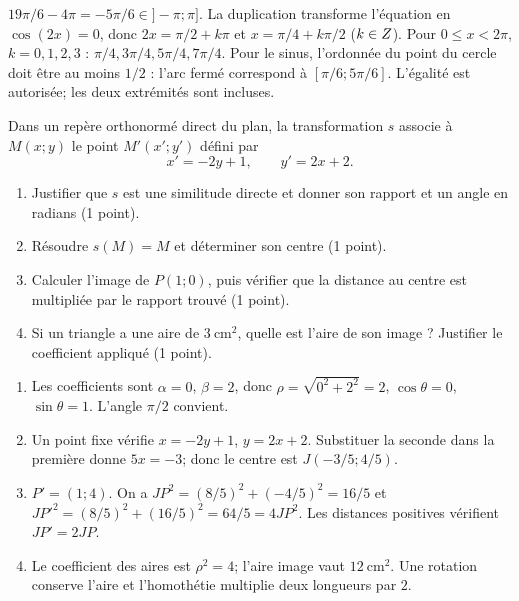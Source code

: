 \begin{corrige}\label{sol-t11s-ds3-e02}
$19\pi/6-4\pi=-5\pi/6\in]-\pi;\pi]$. La duplication transforme l’équation en $\cos(2x)=0$, donc $2x=\pi/2+k\pi$ et $x=\pi/4+k\pi/2$ ($k\in Z$). Pour $0\le x<2\pi$, $k=0,1,2,3$ : $\pi/4,3\pi/4,5\pi/4,7\pi/4$. Pour le sinus, l’ordonnée du point du cercle doit être au moins $1/2$ : l’arc fermé correspond à $[\pi/6;5\pi/6]$. L’égalité est autorisée; les deux extrémités sont incluses.
\end{corrige}
\label{t11s-ds3-e03}\par
Dans un repère orthonormé direct du plan, la transformation $s$ associe à $M(x;y)$ le point $M'(x';y')$ défini par
\[
x'=-2y+1,\qquad y'=2x+2.
\]
\begin{enumerate}
\item Justifier que $s$ est une similitude directe et donner son rapport et un angle en radians (1 point).
\item Résoudre $s(M)=M$ et déterminer son centre (1 point).
\item Calculer l’image de $P(1;0)$, puis vérifier que la distance au centre est multipliée par le rapport trouvé (1 point).
\item Si un triangle a une aire de $3\ \mathrm{cm}^2$, quelle est l’aire de son image ? Justifier le coefficient appliqué (1 point).
\end{enumerate}
\begin{corrige}\label{sol-t11s-ds3-e03}
\begin{enumerate}
\item Les coefficients sont $\alpha=0$, $\beta=2$, donc $\rho=\sqrt{0^2+2^2}=2$, $\cos\theta=0$, $\sin\theta=1$. L’angle $\pi/2$ convient.
\item Un point fixe vérifie $x=-2y+1$, $y=2x+2$. Substituer la seconde dans la première donne $5x=-3$; donc le centre est $J(-3/5;4/5)$.
\item $P'=(1;4)$. On a $JP^2=(8/5)^2+(-4/5)^2=16/5$ et $JP'^2=(8/5)^2+(16/5)^2=64/5=4JP^2$. Les distances positives vérifient $JP'=2JP$.
\item Le coefficient des aires est $\rho^2=4$; l’aire image vaut $12\ \mathrm{cm}^2$. Une rotation conserve l’aire et l’homothétie multiplie deux longueurs par $2$.
\end{enumerate}
\end{corrige}
\label{t11s-ds3-e04}\par
